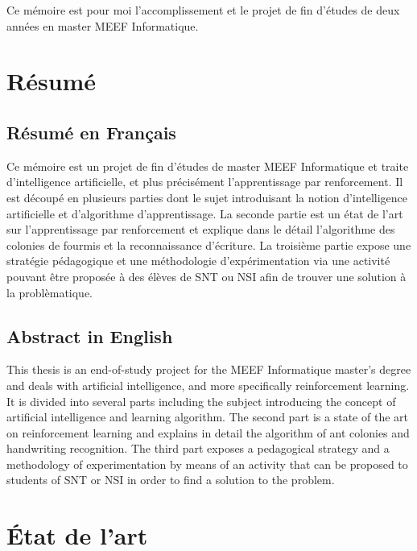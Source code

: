 \documentclass[
12pt,
french,
]{article}
\begin{document}
Ce mémoire est pour moi l'accomplissement et le projet de fin d'études
de deux années en master MEEF Informatique.

\hypertarget{ruxe9sumuxe9}{%
\section{Résumé}\label{ruxe9sumuxe9}}

\hypertarget{ruxe9sumuxe9-en-franuxe7ais}{%
\subsection{Résumé en Français}\label{ruxe9sumuxe9-en-franuxe7ais}}

Ce mémoire est un projet de fin d'études de master MEEF Informatique et
traite d'intelligence artificielle, et plus précisément l'apprentissage
par renforcement. Il est découpé en plusieurs parties dont le sujet
introduisant la notion d'intelligence artificielle et d'algorithme
d'apprentissage. La seconde partie est un état de l'art sur
l'apprentissage par renforcement et explique dans le détail l'algorithme
des colonies de fourmis et la reconnaissance d'écriture. La troisième
partie expose une stratégie pédagogique et une méthodologie
d'expérimentation via une activité pouvant être proposée à des élèves de
SNT ou NSI afin de trouver une solution à la problèmatique.

\hypertarget{abstract-in-english}{%
\subsection{Abstract in English}\label{abstract-in-english}}

This thesis is an end-of-study project for the MEEF Informatique
master's degree and deals with artificial intelligence, and more
specifically reinforcement learning. It is divided into several parts
including the subject introducing the concept of artificial intelligence
and learning algorithm. The second part is a state of the art on
reinforcement learning and explains in detail the algorithm of ant
colonies and handwriting recognition. The third part exposes a
pedagogical strategy and a methodology of experimentation by means of an
activity that can be proposed to students of SNT or NSI in order to find
a solution to the problem.

\hypertarget{uxe9tat-de-lart}{%
\section{État de l'art}\label{uxe9tat-de-lart}}
\end{document}
